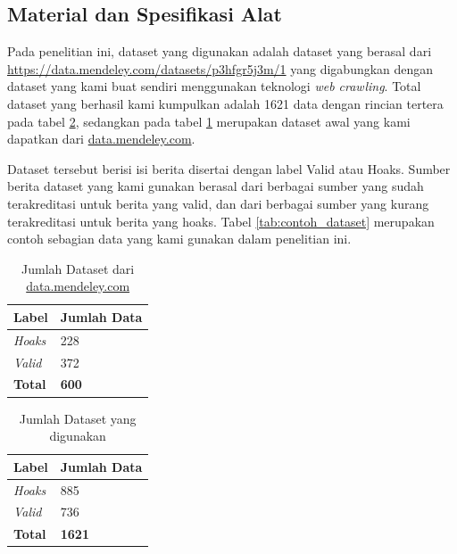 \subsection{Material dan Spesifikasi Alat}

Pada penelitian ini, dataset yang digunakan adalah dataset yang berasal dari \url{https://data.mendeley.com/datasets/p3hfgr5j3m/1} yang digabungkan dengan dataset yang kami buat sendiri menggunakan teknologi \textit{web crawling}. Total dataset yang berhasil kami kumpulkan adalah 1621 data dengan rincian tertera pada tabel \ref{tab:dataset}, sedangkan pada tabel \ref{tab:dataset_mendeley} merupakan dataset awal yang kami dapatkan dari \url{data.mendeley.com}.

Dataset tersebut berisi isi berita disertai dengan label Valid atau Hoaks. Sumber berita dataset yang kami gunakan berasal dari berbagai sumber yang sudah terakreditasi untuk berita yang valid, dan dari berbagai sumber yang kurang terakreditasi untuk berita yang hoaks. Tabel \ref{tab:contoh_dataset} merupakan contoh sebagian data yang kami gunakan dalam penelitian ini.

\begin{table}[h]
    \caption{Jumlah Dataset dari \url{data.mendeley.com}}
    \label{tab:dataset_mendeley}
    \centering
    \begin{tabular}{ | l | l | }
        \hline
        \textbf{Label} & \textbf{Jumlah Data} \\ \hline
        \textit{Hoaks} & 228                  \\ \hline
        \textit{Valid} & 372                  \\ \hline
        \textbf{Total} & \textbf{600}         \\ \hline
    \end{tabular}
\end{table}

\begin{table}[h]
    \caption{Jumlah Dataset yang digunakan}
    \label{tab:dataset}
    \centering
    \begin{tabular}{ | l | l | }
        \hline
        \textbf{Label} & \textbf{Jumlah Data} \\ \hline
        \textit{Hoaks} & 885                  \\ \hline
        \textit{Valid} & 736                  \\ \hline
        \textbf{Total} & \textbf{1621}        \\ \hline
    \end{tabular}
\end{table}


